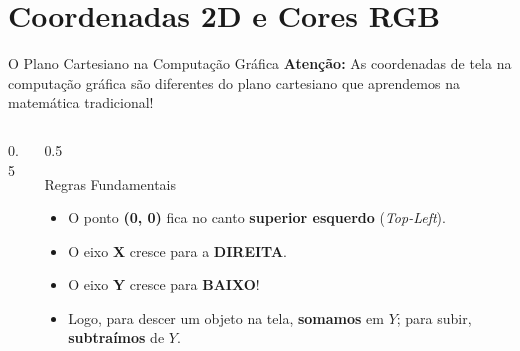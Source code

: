 \section{Coordenadas 2D e Cores RGB}

\begin{frame}{O Plano Cartesiano na Computação Gráfica}
    \textbf{Atenção:} As coordenadas de tela na computação gráfica são diferentes do plano cartesiano que aprendemos na matemática tradicional!

    \vspace{0.2cm}
    \begin{columns}
        \begin{column}{0.5\textwidth}
            \begin{center}
            \end{center}
        \end{column}
        \begin{column}{0.5\textwidth}
            \begin{block}{Regras Fundamentais}
                \begin{itemize}
                    \item O ponto \textbf{(0, 0)} fica no canto \textbf{superior esquerdo} (\textit{Top-Left}).
                    \item O eixo \textbf{X} cresce para a \textbf{DIREITA}.
                    \item O eixo \textbf{Y} cresce para \textbf{BAIXO}!
                    \item Logo, para descer um objeto na tela, \textbf{somamos} em $Y$; para subir, \textbf{subtraímos} de $Y$.
                \end{itemize}
            \end{block}
        \end{column}
    \end{columns}
\end{frame}

